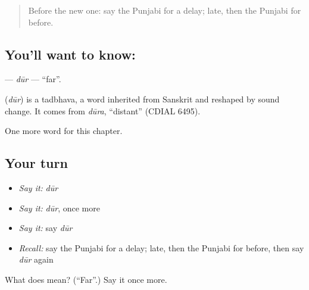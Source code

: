 \label{lesson:PA-C87-dur}



\begin{quote}
Before the new one: say the Punjabi for a delay; late, then the Punjabi for before.
\end{quote}

\subsection*{You'll want to know: }
\textbf{} — \emph{dūr} — \textquotedblleft{}far\textquotedblright{}.

\begin{cousinweb}
\textbf{} (\emph{dūr}) is a tadbhava, a word inherited from Sanskrit and reshaped by sound change. It comes from \emph{dūra}, \textquotedblleft{}distant\textquotedblright{} (CDIAL 6495).
\end{cousinweb}

\begin{grammarlens}[title={What you've built}]
One more word for this chapter.
\end{grammarlens}

\subsection*{Your turn}
\begin{itemize}
\raggedright
  \item \emph{Say it:} \emph{dūr}
  \item \emph{Say it:} \emph{dūr}, once more
  \item \emph{Say it:} say \emph{dūr}
  \item \emph{Recall:} say the Punjabi for a delay; late, then the Punjabi for before, then say \emph{dūr} again
\end{itemize}

\begin{tcolorbox}[breakable,colback=teal!4,colframe=teal!35!black,title={Before you move on}]
What does  mean? (\textquotedblleft{}Far\textquotedblright{}.) Say it once more.
\end{tcolorbox}
